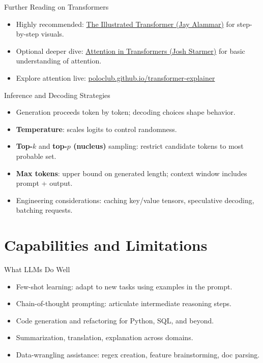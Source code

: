 \documentclass[aspectratio=169]{beamer}
\begin{document}
\begin{frame}{Further Reading on Transformers}
  \begin{itemize}
    \item Highly recommended: \href{https://jalammar.github.io/illustrated-transformer/}{The Illustrated Transformer (Jay Alammar)} for step-by-step visuals.
    \item Optional deeper dive: \href{https://www.deeplearning.ai/short-courses/attention-in-transformers-concepts-and-code-in-pytorch/}{Attention in Transformers (Josh Starmer)} for basic understanding of attention.
    \item Explore attention live: \href{https://poloclub.github.io/transformer-explainer/}{poloclub.github.io/transformer-explainer}

  \end{itemize}
\end{frame}


\begin{frame}{Inference and Decoding Strategies}
  \begin{itemize}
    \item Generation proceeds token by token; decoding choices shape behavior.
    \item \textbf{Temperature}: scales logits to control randomness.
    \item \textbf{Top-$k$} and \textbf{top-$p$ (nucleus)} sampling: restrict candidate tokens to most probable set.
    \item \textbf{Max tokens}: upper bound on generated length; context window includes prompt + output.
    \item Engineering considerations: caching key/value tensors, speculative decoding, batching requests.
  \end{itemize}
\end{frame}

\section{Capabilities and Limitations}

\begin{frame}{What LLMs Do Well}
  \begin{itemize}
    \item Few-shot learning: adapt to new tasks using examples in the prompt.
    \item Chain-of-thought prompting: articulate intermediate reasoning steps.
    \item Code generation and refactoring for Python, SQL, and beyond.
    \item Summarization, translation, explanation across domains.
    \item Data-wrangling assistance: regex creation, feature brainstorming, doc parsing.
  \end{itemize}
\end{frame}
\end{document}

